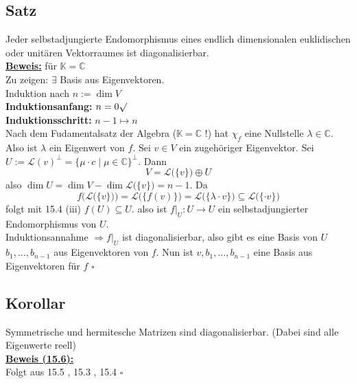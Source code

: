 \subsection{Satz} %
\label{sub:satz}
Jeder selbstadjungierte Endomorphismus eines endlich dimensionalen euklidischen oder unitären Vektorraumes ist diagonalisierbar.
\vspace{10pt} \\
\underline{\textbf{Beweis:}} für $\mathds{K} = \mathds{C}$\\
Zu zeigen: $\exists$ Basis aus Eigenvektoren.  \\
Induktion nach $n := \dim V$ \\
\textbf{Induktionsanfang:} $n=0 \surd$ \\
\textbf{Induktionsschritt:} $n-1 \mapsto n$ \\
Nach dem Fudamentalsatz der Algebra ($\mathds{K}=\mathds{C}$ !) hat $\chi_f$ eine Nullstelle $\lambda \in \mathds{C}$. Also ist $\lambda $ ein Eigenwert von $f$.
Sei $v \in V$ ein zugehöriger Eigenvektor. Sei $U:= \mathcal{L} (v)^\bot = \{ \mu \cdot c \mid \mu \in \mathds{C}\}^\bot$. Dann 
\[
	V = \mathcal{L} \big( \{v\} \big) \oplus U
\]
also $\dim U = \dim V - \dim \mathcal{L} \big( \{v\} \big) = n-1$. Da 
\[
	f \Big(\mathcal{L} \big(\{v\} \big)\Big)= \mathcal{L} \big( \{f(v)\} \big) 
	= \mathcal{L} \big( \{ \lambda \cdot v\} \big) \subseteq  \mathcal{L} \big( \{\cdot v\} \big)
\]
folgt mit 15.4 (iii) $f(U) \subseteq U$. also ist $f \big|_U : U \to U$ ein selbstadjungierter Endomorphismus von $U$. \\
Induktionsannahme $\Rightarrow f \big|_U$ ist diagonalisierbar, also gibt es eine Basis  von $U$ $b_1, \ldots , b_{n-1}$ aus Eigenvektoren von $f$. 
Nun ist $v, b_1, \ldots , b_{n-1}$ eine Basis aus Eigenvektoren für $f$ \hfill \( \square \) 

\subsection{Korollar} %
\label{sub:korollar}
Symmetrische und hermitesche Matrizen sind diagonalisierbar. (Dabei sind alle Eigenwerte reell)
\vspace{\baselineskip} \\
\underline{\textbf{Beweis (15.6):}} \\
Folgt aus 15.5 , 15.3 , 15.4 \hfill \( \square \)

